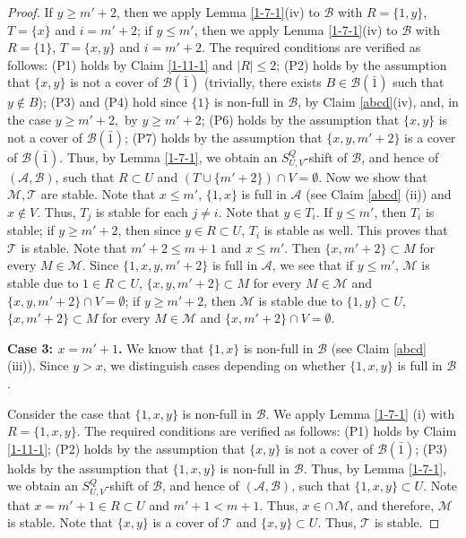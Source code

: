 \documentclass[11pt]{article}
\newcommand{\m}{\mathcal}
\begin{document}
\begin{proof}
If $y\ge m'+2$, then we apply Lemma \ref{1-7-1}(iv) to $\m B$ with $R=\{1, y\}$, $T=\{x\}$ and $i=m'+2$;
if $y\le m'$, then we apply Lemma \ref{1-7-1}(iv) to $\m B$ with $R=\{1\}$, $T=\{x,y\}$ and $i=m'+2$. 
 The 
required conditions are verified as follows: 
(P1) holds by Claim \ref{1-11-1} and $|R|\le 2$; 
(P2) holds by the assumption that $\{x,y\}$ is not a cover of $\m B(\bar1)$ (trivially, there exists $B\in \m B(\bar1)$ such that $y\not\in B$); 
(P3) and (P4) hold since $\{1\}$ is non-full in $\m B$, by Claim \ref{abcd}(iv), and, in the case $y\ge m'+2,$ by $y\ge m'+2$; 
(P6) holds by the assumption that $\{x,y\}$ is not a cover of $ \mathcal{B}(\bar{1})$; (P7) holds by the assumption that $\{x,y, m'+2\}$ is a cover of $ \mathcal{B}(\bar{1})$. 
Thus, by Lemma \ref{1-7-1}, we obtain an $S_{U,V}^Q$-shift of $\m B$, and hence of $(\m A, \m B)$, such that $R\subset U$ and $(T\cup \{m'+2\})\cap V=\emptyset$.
Now we show that $\m M, \m T$ are stable. 
Note that $x\le m'$, $\{1,x\}$ is full in $\m A$ (see Claim \ref{abcd} (ii)) and $x\not\in V$. Thus, $T_j$ is stable for each $j\ne i$. 
Note that $y\in T_i$. 
If $y\le m'$, then $T_i$ is stable; if $y\ge m'+2$, then since $y\in R \subset U$, $T_i$ is stable as well. This proves that $\m T$ is stable.  
Note that $m'+2\le m+1$ and $x\le m'$. Then $\{x, m'+2\}\subset M$ for every $M\in \mathcal{M}$. 
Since $\{1,x,y,m'+2\}$ is full in $\m A$, we see that 
if $y\le m'$, $\m M$ is stable due to $1\in R\subset U$, $\{x, y, m'+2\}\subset M$ for every $M\in \mathcal{M}$ and $\{x,y,m'+2\}\cap V=\emptyset$;
if $y\ge m'+2$, then $\m M$ is stable due to $\{1, y\}\subset U$, $\{x, m'+2\}\subset M$ for every $M\in \mathcal{M}$ and $\{x,m'+2\}\cap V=\emptyset$.



{\bf Case 3: $x = m'+1$.}
We know that $\{1,x\}$ is non-full in $\m B$ (see Claim \ref{abcd} (iii)). 
Since $y>x$, we distinguish cases depending on whether $\{1,x,y\}$ is full in $\mathcal{B}$. 

Consider the case that $\{1,x,y\}$ is non-full in $\m B$. 
We apply Lemma \ref{1-7-1} (i) with $R=\{1,x,y\}$.
The required conditions are verified as follows:
(P1) holds by Claim \ref{1-11-1}; 
(P2) holds by the assumption that $\{x,y\}$ is not a cover of $\m B(\bar1)$; 
(P3) holds by the assumption that $\{1,x,y\}$ is non-full in $\m B$. 
Thus, by Lemma \ref{1-7-1}, we obtain an $S_{U,V}^Q$-shift of $\m B$, and hence of $(\m A, \m B)$, such that $\{1, x,y\}\subset U$. 
Note that $x=m'+1\in R\subset U$ and $m'+1<m+1$. Thus, $x\in \cap\, \m M$, and therefore, $\mathcal{M}$ is stable. 
Note that $\{x,y\}$ is a cover of $\m T$ and $\{x,y\}\subset U$. Thus,
$\mathcal{T}$ is stable. 


\end{proof}
\end{document}
